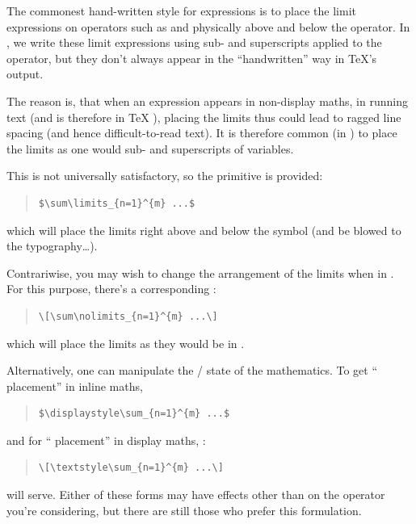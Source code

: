 The commonest hand-written style for expressions is to place the limit
expressions on operators such as  and  physically
above and below the operator.  In \AllTeX{}, we write these limit
expressions using sub- and superscripts applied to the operator, but
they don't always appear in the ``handwritten'' way in \TeX{}'s
output.

The reason is, that when an expression appears in non-display maths,
in running text (and is therefore in \TeX{} ), placing
the limits thus could lead to ragged line spacing (and hence
difficult-to-read text).  It is therefore common (in )
to place the limits as one would sub- and superscripts of variables.

This is not universally satisfactory, so the primitive  is
provided:
\begin{quote}
\begin{verbatim}
$\sum\limits_{n=1}^{m} ...$
\end{verbatim}
\end{quote}
which will place the limits right above and below the symbol (and be
blowed to the typography\dots{}).

Contrariwise, you may wish to change the arrangement of the limits
when in .  For this purpose, there's a corresponding
:
\begin{quote}
\begin{verbatim}
\[\sum\nolimits_{n=1}^{m} ...\]
\end{verbatim}
\end{quote}
which will place the limits as they would be in .

Alternatively, one can manipulate the
/ state of the mathematics.  To get
`` placement'' in inline maths,
\begin{quote}
\begin{verbatim}
$\displaystyle\sum_{n=1}^{m} ...$
\end{verbatim}
\end{quote}
and for `` placement'' in display maths,
:
\begin{quote}
\begin{verbatim}
\[\textstyle\sum_{n=1}^{m} ...\]
\end{verbatim}
\end{quote}
will serve.  Either of these forms may have effects other than on the
operator you're considering, but there are still those who prefer this
formulation.

